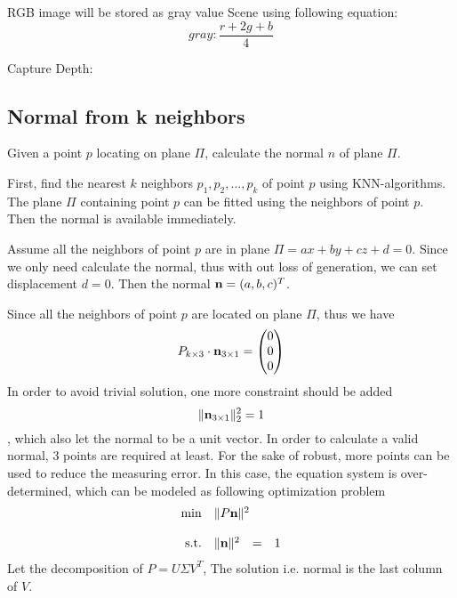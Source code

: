 RGB image will be stored as gray value Scene using following equation:
\[ gray: \frac{r+2g+b}{4}  \]



Capture Depth:
\[   \]


\subsection{Normal from k neighbors}

Given a point $ p $ locating on plane $ \Pi $, calculate the normal $ n $ of plane $ \Pi $. 

First, find the nearest $ k $ neighbors $ p_1,p_2,...,p_k $ of point $ p $ using KNN-algorithms. The plane $ \Pi $ containing point $ p $ can be fitted using the neighbors of point $ p $. Then the normal is available immediately.

Assume all the neighbors of point $ p $ are in plane $ \Pi = ax+by+cz+d=0 $. Since we only need calculate the normal, thus with out loss of generation, we can set displacement $ d = 0 $. Then the normal $  \textbf{n} = (a,b,c)^T  $.

Since all the neighbors of point $ p $ are located on plane $ \Pi $, thus we have 
\[ 
P_{k \times 3} \cdot  \textbf{n}_{3 \times 1} = \left(
\begin{matrix}
0 \\
0\\
0
\end{matrix}  \right) \]
In order to avoid trivial solution, one more constraint should be added
\[ \|  \textbf{n}_{3 \times 1} \|_2^2 = 1  \], which also let the normal to be a unit vector.
In order to calculate a valid normal, 3 points are required at least. For the sake of robust, more points can be used to reduce the measuring error. In this case, the equation system is over-determined, which can be modeled as following optimization problem
\begin{equation}
	\begin{array}{rrclcl}
		\displaystyle \min & \multicolumn{3}{l}{\| P  \bn \|^2} \\
		\\
		\textrm{s.t.} & \| \bn \|^2 & = & 1 
	\end{array}
\end{equation}
Let the decomposition of $ P=U\Sigma V^T $, The solution i.e. normal is the last column of $ V $.


